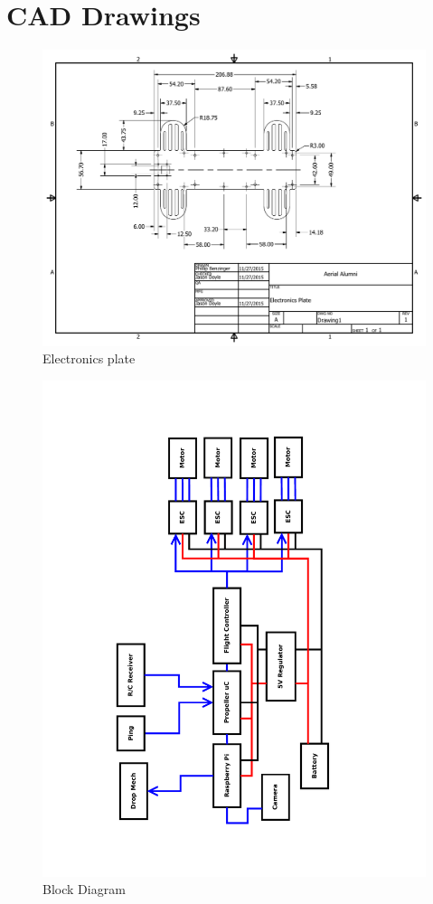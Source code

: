 \documentclass{article}
\begin{document}
\clearpage

\section{CAD Drawings}

\begin{figure}[h!]
\caption{Electronics plate}
\includegraphics[scale=0.65, angle=90]{CAD.pdf}
\end{figure}

\begin{figure}[h]
\caption{Block Diagram}
\includegraphics[width=\textwidth]{Block_Diagam_v2.pdf}
\end{figure}
\end{document}
